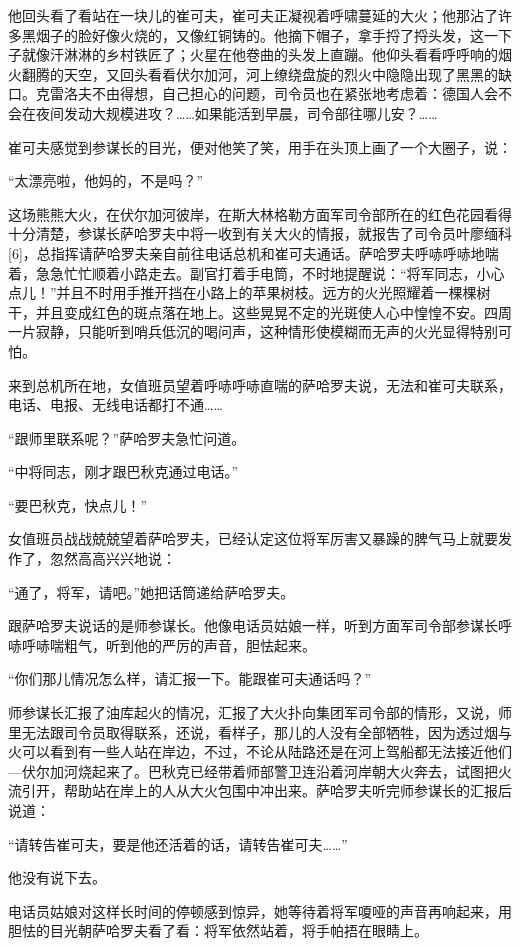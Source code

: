 他回头看了看站在一块儿的崔可夫，崔可夫正凝视着呼啸蔓延的大火；他那沾了许多黑烟子的脸好像火烧的，又像红铜铸的。他摘下帽子，拿手捋了捋头发，这一下子就像汗淋淋的乡村铁匠了；火星在他卷曲的头发上直蹦。他仰头看看呼呼响的烟火翻腾的天空，又回头看看伏尔加河，河上缭绕盘旋的烈火中隐隐出现了黑黑的缺口。克雷洛夫不由得想，自己担心的问题，司令员也在紧张地考虑着：德国人会不会在夜间发动大规模进攻？……如果能活到早晨，司令部往哪儿安？……

崔可夫感觉到参谋长的目光，便对他笑了笑，用手在头顶上画了一个大圈子，说：

“太漂亮啦，他妈的，不是吗？”

这场熊熊大火，在伏尔加河彼岸，在斯大林格勒方面军司令部所在的红色花园看得十分清楚，参谋长萨哈罗夫中将一收到有关大火的情报，就报吿了司令员叶廖缅科[6]，总指挥请萨哈罗夫亲自前往电话总机和崔可夫通话。萨哈罗夫呼哧呼哧地喘着，急急忙忙顺着小路走去。副官打着手电筒，不时地提醒说：“将军同志，小心点儿！”并且不时用手推开挡在小路上的苹果树枝。远方的火光照耀着一棵棵树干，并且变成红色的斑点落在地上。这些晃晃不定的光斑使人心中惶惶不安。四周一片寂静，只能听到哨兵低沉的喝问声，这种情形使模糊而无声的火光显得特别可怕。

来到总机所在地，女值班员望着呼哧呼哧直喘的萨哈罗夫说，无法和崔可夫联系，电话、电报、无线电话都打不通……

“跟师里联系呢？”萨哈罗夫急忙问道。

“中将同志，刚才跟巴秋克通过电话。”

“要巴秋克，快点儿！”

女值班员战战兢兢望着萨哈罗夫，已经认定这位将军厉害又暴躁的脾气马上就要发作了，忽然高高兴兴地说：

“通了，将军，请吧。”她把话筒递给萨哈罗夫。

跟萨哈罗夫说话的是师参谋长。他像电话员姑娘一样，听到方面军司令部参谋长呼哧呼哧喘粗气，听到他的严厉的声音，胆怯起来。

“你们那儿情况怎么样，请汇报一下。能跟崔可夫通话吗？”

师参谋长汇报了油库起火的情况，汇报了大火扑向集团军司令部的情形，又说，师里无法跟司令员取得联系，还说，看样子，那儿的人没有全部牺牲，因为透过烟与火可以看到有一些人站在岸边，不过，不论从陆路还是在河上驾船都无法接近他们—伏尔加河烧起来了。巴秋克已经带着师部警卫连沿着河岸朝大火奔去，试图把火流引开，帮助站在岸上的人从大火包围中冲出来。萨哈罗夫听完师参谋长的汇报后说道：

“请转告崔可夫，要是他还活着的话，请转告崔可夫……”

他没有说下去。

电话员姑娘对这样长时间的停顿感到惊异，她等待着将军嗄哑的声音再响起来，用胆怯的目光朝萨哈罗夫看了看：将军依然站着，将手帕捂在眼睛上。

